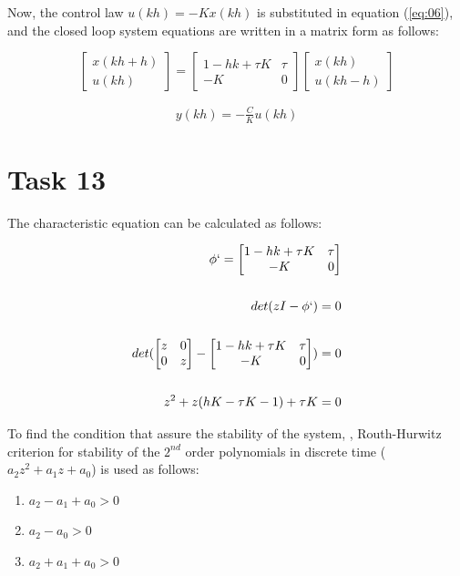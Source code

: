 \documentclass[a4paper,12pt,oneside,onecolumn]{article} %
\begin{document}
Now, the control law  $u(kh)=-Kx(kh)$ is substituted in equation (\ref{eq:06}), and the closed loop system equations are written in a matrix form as follows:

\[
\begin{bmatrix}
x(kh+h) \\ u(kh)
\end{bmatrix}
=
  \begin{bmatrix}
    1-hk+\tau K & \tau \\
    -K & 0
  \end{bmatrix}
  \begin{bmatrix}
    x(kh) \\
    u(kh-h)
  \end{bmatrix}
\]

\begin{align*}
    y(kh)=-\frac{C}{K} u(kh)
\end{align*}


\section*{Task 13}

The characteristic equation can be calculated as follows: 

\begin{align*}
    \phi`= \begin{bmatrix}
    1-hk+\tau K & \tau \\
    -K & 0
   \end{bmatrix}
\\ \\
det(z I -\phi`)=0
\\ \\
det(\begin{bmatrix}
    z & 0 \\
    0 & z
   \end{bmatrix} - \begin{bmatrix}
    1-hk+\tau K & \tau \\
    -K & 0
   \end{bmatrix}) =0
\\ \\
z^2 + z(hK-\tau K - 1)+\tau K =0
\end{align*} 

To find the condition that assure the stability of the system, , Routh-Hurwitz criterion for stability of the $2^{nd}$ order polynomials in discrete time ($a_2 z^2 + a_1 z + a_0$) is used as follows:
\begin{enumerate} 
\item $a_2-a_1+a_0 > 0$
\item $a_2-a_0 >0$
\item $a_2+a_1+a_0 > 0$
\end{enumerate} 
\end{document}
